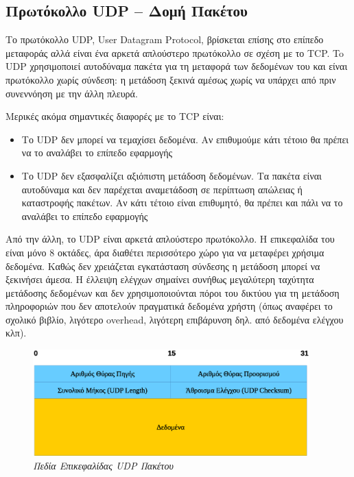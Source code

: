 %
%
\subsection{Πρωτόκολλο UDP -- Δομή Πακέτου}

Το πρωτόκολλο UDP, User Datagram Protocol, βρίσκεται επίσης στο επίπεδο μεταφοράς αλλά είναι ένα αρκετά απλούστερο πρωτόκολλο σε σχέση με το TCP. To UDP χρησιμοποιεί αυτοδύναμα πακέτα για τη μεταφορά των δεδομένων του και είναι πρωτόκολλο χωρίς σύνδεση: η μετάδοση ξεκινά αμέσως χωρίς να υπάρχει από πριν συνεννόηση με την άλλη πλευρά. 

Μερικές ακόμα σημαντικές διαφορές με το TCP είναι:

\begin{itemize}
\item Το UDP δεν μπορεί να τεμαχίσει δεδομένα. Αν επιθυμούμε κάτι τέτοιο θα πρέπει να το αναλάβει το επίπεδο εφαρμογής
\item Το UDP δεν εξασφαλίζει αξιόπιστη μετάδοση δεδομένων. Τα πακέτα είναι αυτοδύναμα και δεν παρέχεται αναμετάδοση σε περίπτωση απώλειας ή καταστροφής πακέτων. Αν κάτι τέτοιο είναι επιθυμητό, θα πρέπει και πάλι να το αναλάβει το επίπεδο εφαρμογής
\end{itemize}

Από την άλλη, το UDP είναι αρκετά απλούστερο πρωτόκολλο. Η επικεφαλίδα του είναι μόνο 8 οκτάδες, άρα διαθέτει περισσότερο χώρο για να μεταφέρει χρήσιμα δεδομένα. Καθώς δεν χρειάζεται εγκατάσταση σύνδεσης η μετάδοση μπορεί να ξεκινήσει άμεσα. Η έλλειψη ελέγχων σημαίνει συνήθως μεγαλύτερη ταχύτητα μετάδοσης δεδομένων και δεν χρησιμοποιούνται πόροι του δικτύου για τη μετάδοση πληροφοριών που δεν αποτελούν πραγματικά δεδομένα χρήστη (όπως αναφέρει το σχολικό βιβλίο, λιγότερο overhead, λιγότερη επιβάρυνση δηλ. από δεδομένα ελέγχου κλπ).

\begin{figure}[!ht]
 \centering
 \includegraphics[width=0.95\textwidth]{images/chapter4/4-4}
 \caption {\textsl{Πεδία Επικεφαλίδας UDP Πακέτου}}
 \label{4-4}
\end{figure}

